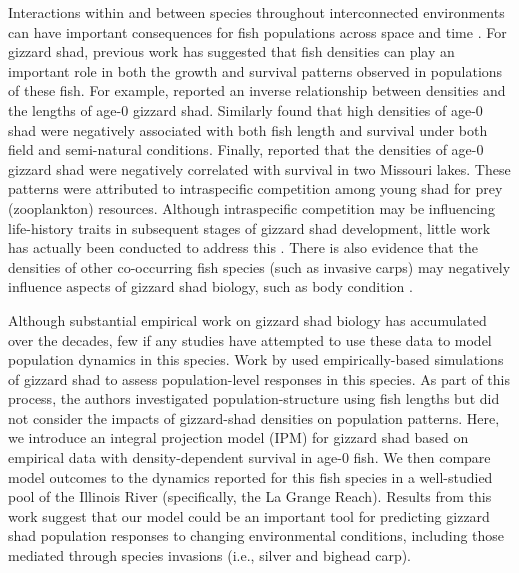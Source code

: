 \documentclass[preprint,review,12pt,authoryear]{elsarticle}
\begin{document}
Interactions within and between species throughout interconnected environments can have important consequences for fish populations across space and time \citep{thorp2006riverine}.  
For gizzard shad, previous work has suggested that fish densities can play an important role in both the growth and survival patterns observed in populations of these fish.  
For example, \citep{buynak1992differential} reported an inverse relationship between densities and the lengths of age-0 gizzard shad.  Similarly \citep{welker1994growth} found that high densities of age-0 shad were negatively associated with both fish length and survival under both field and semi-natural conditions. Finally, \citep{michaletz2010overwinter} reported that the densities of age-0 gizzard shad were negatively correlated with survival in two Missouri lakes.  
These patterns were attributed to intraspecific competition among young shad for prey (zooplankton) resources. Although intraspecific competition may be influencing life-history traits in subsequent stages of gizzard shad development, little work has actually been conducted to address this \citep{dicenzo1996relations}. 
There is also evidence that the densities of other co-occurring fish species (such as invasive carps) may negatively influence aspects of gizzard shad biology, such as body condition \citep{irons2007reduced,love2018does}.

Although substantial empirical work on gizzard shad biology has accumulated over the decades, few if any studies have attempted to use these data to model population dynamics in this species.
Work by \citet{catalano2010size, catalano2011whole} used empirically-based simulations of gizzard shad to assess population-level responses in this species.
As part of this process, the authors investigated population-structure using fish lengths but did
not consider the impacts of gizzard-shad densities on population patterns.
Here, we introduce an integral projection model (IPM) for gizzard shad based on empirical data with density-dependent survival in age-0 fish.
We then compare model outcomes to the dynamics reported for this fish species in a well-studied pool of the Illinois River (specifically, the La Grange Reach).
Results from this work suggest that our model could be an important tool for predicting gizzard shad population responses to changing environmental conditions, including those mediated through species invasions (i.e., silver and bighead carp).
\end{document}
